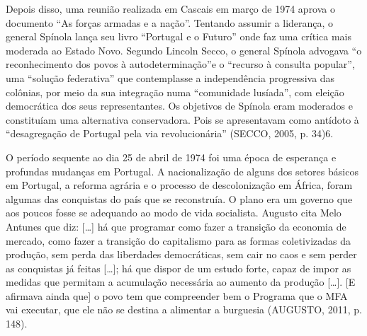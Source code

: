\documentclass[../DISSERTACAO_MAIN.tex]{subfiles}
\begin{document}
Depois disso, uma reunião realizada em Cascais em março de 1974 aprova o documento “As forças armadas e a nação”. Tentando assumir a liderança, o general Spínola lança seu livro “Portugal e o Futuro” onde faz uma crítica mais moderada ao Estado Novo. Segundo Lincoln Secco, 
o general Spínola advogava “o reconhecimento dos povos à autodeterminação”e o “recurso à consulta popular”, uma “solução federativa” que contemplasse a independência progressiva das colônias, por meio da sua integração numa “comunidade lusíada”, com eleição democrática dos seus representantes. Os objetivos de Spínola eram moderados e constituíam uma alternativa conservadora. Pois se apresentavam como antídoto à “desagregação de Portugal pela via revolucionária” (SECCO, 2005, p. 34)6.

O período sequente ao dia 25 de abril de 1974 foi uma época de esperança e profundas mudanças em Portugal. A nacionalização de alguns dos setores básicos em Portugal, a reforma agrária e o processo de descolonização em África, foram algumas das conquistas do país que se reconstruía. O plano era um governo que aos poucos fosse se adequando ao modo de vida socialista. Augusto cita Melo Antunes que diz:
[…] há que programar como fazer a transição da economia de mercado, como fazer a transição do capitalismo para as formas coletivizadas da produção, sem perda das liberdades democráticas, sem cair no caos e sem perder as conquistas já feitas […]; há que dispor de um estudo forte, capaz de impor as medidas que permitam a acumulação necessária ao aumento da produção […]. [E afirmava ainda que] o povo tem que compreender bem o Programa que o MFA vai executar, que ele não se destina a alimentar a burguesia (AUGUSTO, 2011, p. 148).
\end{document}
